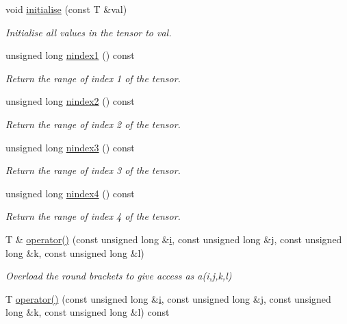 \begin{DoxyCompactItemize}
void \hyperlink{classoomph_1_1RankFourTensor_ae75018549ea237c4608b41ecc62eef65}{initialise} (const T \&val)
\begin{DoxyCompactList}\small\item\em Initialise all values in the tensor to val. \end{DoxyCompactList}\item 
unsigned long \hyperlink{classoomph_1_1RankFourTensor_a96a373f0573d4fc37a23a6eaee4c3fec}{nindex1} () const
\begin{DoxyCompactList}\small\item\em Return the range of index 1 of the tensor. \end{DoxyCompactList}\item 
unsigned long \hyperlink{classoomph_1_1RankFourTensor_a78ffffb217f84535529c6c9cb5d1b91f}{nindex2} () const
\begin{DoxyCompactList}\small\item\em Return the range of index 2 of the tensor. \end{DoxyCompactList}\item 
unsigned long \hyperlink{classoomph_1_1RankFourTensor_ab9d4f33cb872d48050eb05c879f19011}{nindex3} () const
\begin{DoxyCompactList}\small\item\em Return the range of index 3 of the tensor. \end{DoxyCompactList}\item 
unsigned long \hyperlink{classoomph_1_1RankFourTensor_a5bf51e7091f081ff09d2ef710131b9e0}{nindex4} () const
\begin{DoxyCompactList}\small\item\em Return the range of index 4 of the tensor. \end{DoxyCompactList}\item 
T \& \hyperlink{classoomph_1_1RankFourTensor_ab156bfb614c94c72d72452812d39897d}{operator()} (const unsigned long \&\hyperlink{cfortran_8h_adb50e893b86b3e55e751a42eab3cba82}{i}, const unsigned long \&j, const unsigned long \&k, const unsigned long \&l)
\begin{DoxyCompactList}\small\item\em Overload the round brackets to give access as a(i,j,k,l) \end{DoxyCompactList}\item 
T \hyperlink{classoomph_1_1RankFourTensor_ab2319b2c0d1e48c6908b3a51c6105099}{operator()} (const unsigned long \&\hyperlink{cfortran_8h_adb50e893b86b3e55e751a42eab3cba82}{i}, const unsigned long \&j, const unsigned long \&k, const unsigned long \&l) const

\end{DoxyCompactItemize}
